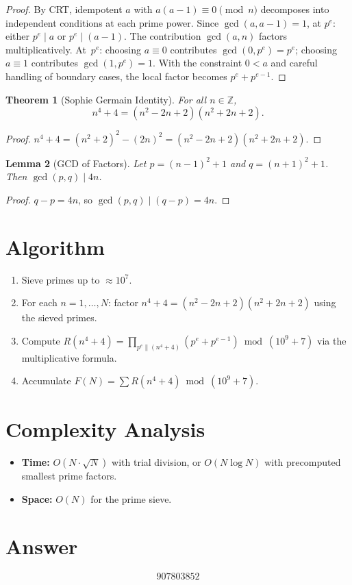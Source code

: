 \documentclass[12pt]{article}
\newtheorem{theorem}{Theorem}
\newtheorem{lemma}[theorem]{Lemma}
\begin{document}
\begin{proof}
By CRT, idempotent $a$ with $a(a-1) \equiv 0 \pmod{n}$ decomposes into independent conditions at each prime power. Since $\gcd(a, a-1) = 1$, at $p^e$: either $p^e \mid a$ or $p^e \mid (a-1)$. The contribution $\gcd(a, n)$ factors multiplicatively. At~$p^e$: choosing $a \equiv 0$ contributes $\gcd(0, p^e) = p^e$; choosing $a \equiv 1$ contributes $\gcd(1, p^e) = 1$. With the constraint $0 < a$ and careful handling of boundary cases, the local factor becomes $p^e + p^{e-1}$.
\end{proof}

\begin{theorem}[Sophie Germain Identity]
For all $n \in \mathbb{Z}$,
\[
n^4 + 4 = (n^2 - 2n + 2)(n^2 + 2n + 2).
\]
\end{theorem}

\begin{proof}
$n^4 + 4 = (n^2 + 2)^2 - (2n)^2 = (n^2 - 2n + 2)(n^2 + 2n + 2)$.
\end{proof}

\begin{lemma}[GCD of Factors]
Let $p = (n-1)^2 + 1$ and $q = (n+1)^2 + 1$. Then $\gcd(p, q) \mid 4n$.
\end{lemma}

\begin{proof}
$q - p = 4n$, so $\gcd(p,q) \mid (q - p) = 4n$.
\end{proof}

\section{Algorithm}

\begin{enumerate}
\item Sieve primes up to $\approx 10^7$.
\item For each $n = 1, \ldots, N$: factor $n^4 + 4 = (n^2 - 2n + 2)(n^2 + 2n + 2)$ using the sieved primes.
\item Compute $R(n^4 + 4) = \prod_{p^e \| (n^4+4)} (p^e + p^{e-1}) \bmod (10^9+7)$ via the multiplicative formula.
\item Accumulate $F(N) = \sum R(n^4+4) \bmod (10^9+7)$.
\end{enumerate}

\section{Complexity Analysis}

\begin{itemize}
\item \textbf{Time:} $O(N \cdot \sqrt{N})$ with trial division, or $O(N \log N)$ with precomputed smallest prime factors.
\item \textbf{Space:} $O(N)$ for the prime sieve.
\end{itemize}

\section{Answer}

\[
\boxed{907803852}
\]
\end{document}
